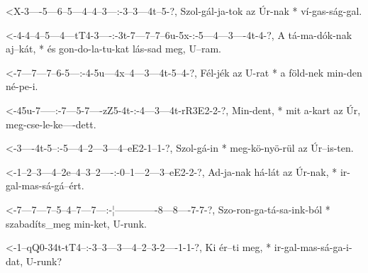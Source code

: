   {<X-3----5---6--5---4--4--3---:-3--3---4t--5-?,}
  {   Szol-gál-ja-tok az Úr-nak * ví-gas-ság-gal.}


  {<-4-4--4--5---4---tT4-3----:-3t-7---7--7--6u-5x-:-5---4---3----4t-4-?,}
  {  A tá-ma-dók-nak aj--kát, * és gon-do-la-tu-kat  lás-sad meg, U--ram.}

  {<-7---7---7--6-5---:-4-5u---4x--4---3---4t-5--4-?,}
  {  Fél-jék az U-rat * a föld-nek min-den né-pe-i.}


  {<-45u-7-----:-7---5-7----zZ5-4t-:-4---3---4t-rR3E2-2-?,}
  {  Min-dent, * mit a-kart az  Úr,  meg-cse-le-ke----dett.}

  {<-3----4t-5--:-5---4--2---3---4--eE2-1--1-?,}
  {  Szol-gá-in * meg-kö-nyö-rül az Úr--is-ten.}




  {<-1--2--3---4--2e--4--3--2----:-0--1---2---3--eE2-2-?,}
  {  Ad-ja-nak há-lát az Úr-nak, * ir-gal-mas-sá-gá--ért.}

  {<-7---7---7--5--4--7---7---:-¦-------------8---8----7-7-?,}
  {  Szo-ron-ga-tá-sa-ink-ból * szabadíts_meg min-ket, U-runk.}

  {<-1--qQ0-34t-tT4--:-3--3---3---4--2--3-2----1-1-?,}
  {  Ki ér--ti  meg, * ir-gal-mas-sá-ga-i-dat, U-runk?}

